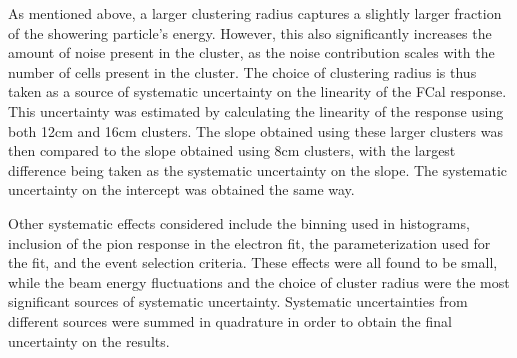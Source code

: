 
As mentioned above, a larger clustering radius captures a slightly larger fraction of the showering particle's energy. However, this also significantly increases the amount of noise present in the cluster, as the noise contribution scales with the number of cells present in the cluster. The choice of clustering radius is thus taken as a source of systematic uncertainty on the linearity of the FCal response. This uncertainty was estimated by calculating the linearity of the response using both 12cm and 16cm clusters. The slope obtained using these larger clusters was then compared to the slope obtained using 8cm clusters, with the largest difference being taken as the systematic uncertainty on the slope. The systematic uncertainty on the intercept was obtained the same way.

Other systematic effects considered include the binning used in histograms, inclusion of the pion response in the electron fit, the parameterization used for the fit, and the event selection criteria. These effects were all found to be small, while the beam energy fluctuations and the choice of cluster radius were the most significant sources of systematic uncertainty. Systematic uncertainties from different sources were summed in quadrature in order to obtain the final uncertainty on the results.

%

